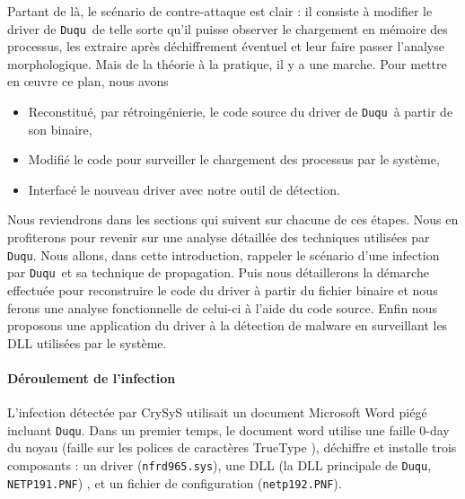 \documentclass[times,11pt,fullpage]{article}
\newcommand{\Duqu}{\texttt{Duqu}}
\newcommand{\driver}{\texttt{nfrd965.sys}}
\newcommand{\netpDLL}{\texttt{NETP191.PNF}}
\newcommand{\netpCONF}{\texttt{netp192.PNF}}
\begin{document}
Partant de là, le scénario de contre-attaque est clair : il consiste à modifier le driver de \Duqu\ de telle sorte qu'il puisse observer le chargement en mémoire des processus, les extraire après déchiffrement éventuel et leur faire passer l'analyse morphologique. Mais de la théorie à la pratique, il y a une marche. Pour mettre en \oe uvre ce plan, nous avons 
\begin{itemize}
\item Reconstitué, par rétroingénierie, le code source du driver de \Duqu\ à partir de son binaire,  
\item Modifié le code pour surveiller le chargement des processus par le système,
\item Interfacé le nouveau driver avec notre outil de détection.
\end{itemize}

Nous reviendrons dans les sections qui suivent sur chacune de ces étapes. Nous en profiterons pour revenir sur une analyse détaillée des techniques utilisées par \Duqu. Nous allons, dans cette introduction, rappeler le scénario d'une infection par \Duqu\ et sa technique de propagation. Puis nous détaillerons la démarche effectuée pour reconstruire le code du driver à partir du fichier binaire et nous ferons une analyse fonctionnelle de celui-ci à l'aide du code source. Enfin nous proposons une application du driver à la détection de malware en surveillant les DLL utilisées par le système.
  




\paragraph{Déroulement de l'infection}
L'infection détectée par CrySyS utilisait un document Microsoft Word piégé incluant \Duqu.
Dans un premier temps, le document word utilise une faille $0$-day du noyau (faille sur les polices de caractères TrueType \cite{AThierry_CVETrueType}), déchiffre et installe trois composants : 
un driver (\driver), 
une DLL (la DLL principale de \Duqu, \netpDLL) , 
et un fichier de configuration (\netpCONF). 
\end{document}
